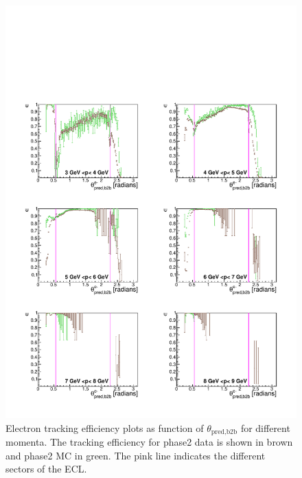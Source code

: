 \documentclass[a4paper,11pt,twosided,final,german,openbib,pdftex,listof=totoc,bibliography=totoc]{scrbook}
\begin{document}
\begin{figure}[!htbp]
	\centering
	\includegraphics[width=\textwidth]{Plots/master/xPMThetaem}
	\caption[Momentum $\theta_{\textrm{pred,b2b}}$ Electron Efficiency Phase2]{Electron tracking efficiency plots as function of $\theta_{\textrm{pred,b2b}}$ for different momenta. The tracking efficiency for phase2 data is shown in brown and phase2 MC in green. The pink line indicates the different sectors of the ECL.}
	
	\label{plt:xPMThetaem}
\end{figure}
\end{document}
